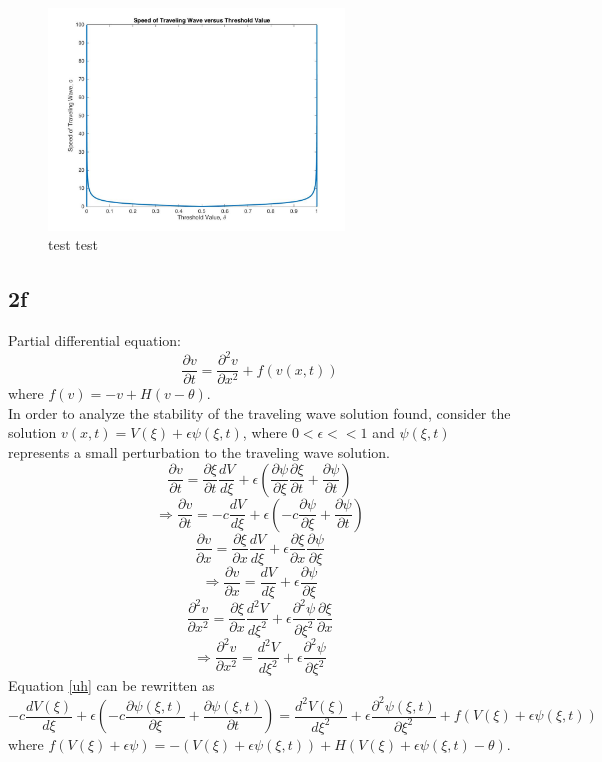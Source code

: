 \documentclass[11pt, oneside]{article}   	%
\begin{document}
\begin{figure}[H]
\includegraphics[width=0.7\textwidth]{cVStheta.jpg}
\caption{test test}
\label{test}
\end{figure}

\subsection{2f}
Partial differential equation: 
\begin{equation}
\label{uh}
\frac{\partial v}{\partial t}=\frac{\partial ^2 v}{\partial x^2}+f(v(x,t))
\end{equation}
where $f(v)=-v+H(v-\theta)$.\\
In order to analyze the stability of the traveling wave solution found, consider the solution $v(x,t)=V(\xi)+\epsilon\psi(\xi,t)$, where $0 < \epsilon <<1$ and $\psi(\xi,t)$ represents a small perturbation to the traveling wave solution. 
$$\frac{\partial v}{\partial t}=\frac{\partial\xi}{\partial t}\frac{dV}{d\xi}+\epsilon(\frac{\partial \psi}{\partial \xi}\frac{\partial \xi}{\partial t}+\frac{\partial \psi}{\partial t})$$
$$\Rightarrow \frac{\partial v}{\partial t}=-c\frac{dV}{d\xi}+\epsilon(-c\frac{\partial \psi}{\partial \xi}+\frac{\partial \psi}{\partial t})$$
$$\frac{\partial v}{\partial x}=\frac{\partial \xi}{\partial x}\frac{dV}{d\xi}+\epsilon\frac{\partial\xi}{\partial x}\frac{\partial\psi}{\partial\xi}$$
$$\Rightarrow \frac{\partial v}{\partial x}=\frac{dV}{d\xi}+\epsilon\frac{\partial\psi}{\partial\xi}$$
$$\frac{\partial^2 v}{\partial x^2}=\frac{\partial \xi}{\partial x}\frac{d^2V}{d\xi^2}+\epsilon\frac{\partial^2\psi}{\partial\xi^2}\frac{\partial \xi}{\partial x}$$
$$\Rightarrow \frac{\partial^2 v}{\partial x^2}=\frac{d^2V}{d\xi^2}+\epsilon\frac{\partial^2\psi}{\partial\xi^2}$$
Equation \ref{uh} can be rewritten as 
\begin{equation}
\label{frewritten}
-c\frac{dV(\xi)}{d\xi}+\epsilon(-c\frac{\partial \psi(\xi,t)}{\partial \xi}+\frac{\partial \psi(\xi,t)}{\partial t})=\frac{d^2V(\xi)}{d\xi^2}+\epsilon\frac{\partial^2\psi(\xi,t)}{\partial\xi^2}+f(V(\xi)+\epsilon\psi(\xi,t))
\end{equation}
where $f(V(\xi)+\epsilon\psi)=-(V(\xi)+\epsilon\psi(\xi,t))+H(V(\xi)+\epsilon\psi(\xi,t)-\theta)$.\\
\end{document}
